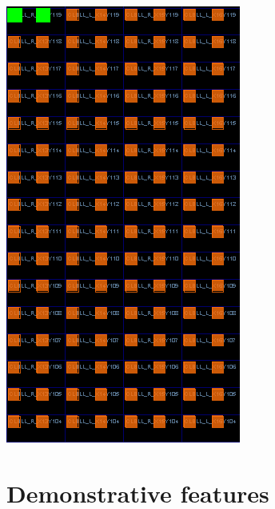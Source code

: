 \begin{minipage}[b]{0.32\linewidth}   
    \centering
\includegraphics[width=\linewidth]{images/tero_8_array_CLB.png}
\end{minipage}

\section{Demonstrative features}
\label{sec:demon_feature}

